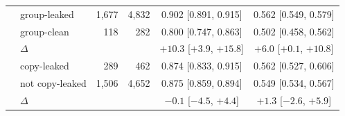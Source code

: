\begin{table}[tp]
\begin{tabular}{llrrcc}
 & group-leaked & 1{,}677 & 4{,}832 & 0.902 [0.891, 0.915] & 0.562 [0.549, 0.579] \\
 & group-clean & 118 & 282 & 0.800 [0.747, 0.863] & 0.502 [0.458, 0.562] \\
 & $\Delta$ & & & $+10.3$ [$+3.9$, $+15.8$] & $+6.0$ [$+0.1$, $+10.8$] \\
 & copy-leaked & 289 & 462 & 0.874 [0.833, 0.915] & 0.562 [0.527, 0.606] \\
 & not copy-leaked & 1{,}506 & 4{,}652 & 0.875 [0.859, 0.894] & 0.549 [0.534, 0.567] \\
 & $\Delta$ & & & $-0.1$ [$-4.5$, $+4.4$] & $+1.3$ [$-2.6$, $+5.9$] \\
\bottomrule
\end{tabular}
\end{table}
